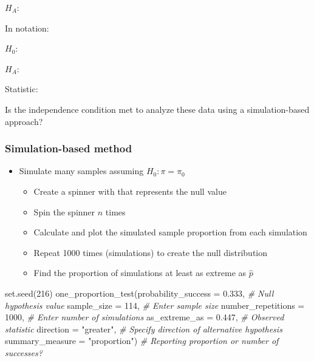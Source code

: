 \documentclass[
]{report}
\newenvironment{Shaded}{\begin{snugshade}}{\end{snugshade}}
\newcommand{\AttributeTok}[1]{\textcolor[rgb]{0.77,0.63,0.00}{#1}}
\newcommand{\CommentTok}[1]{\textcolor[rgb]{0.56,0.35,0.01}{\textit{#1}}}
\newcommand{\DecValTok}[1]{\textcolor[rgb]{0.00,0.00,0.81}{#1}}
\newcommand{\FloatTok}[1]{\textcolor[rgb]{0.00,0.00,0.81}{#1}}
\newcommand{\FunctionTok}[1]{\textcolor[rgb]{0.00,0.00,0.00}{#1}}
\newcommand{\NormalTok}[1]{#1}
\newcommand{\StringTok}[1]{\textcolor[rgb]{0.31,0.60,0.02}{#1}}
\begin{document}
\vspace{0.5in}

\(H_A:\)

\vspace{0.5in}

In notation:

\(H_0:\)

\vspace{0.2in}

\(H_A:\)

\vspace{0.2in}

Statistic:

\vspace{0.2in}

Is the independence condition met to analyze these data using a simulation-based approach?

\vspace{0.3in}

\hypertarget{simulation-based-method-1}{%
\subsubsection*{Simulation-based method}\label{simulation-based-method-1}}

\begin{itemize}
\item
  Simulate many samples assuming \(H_0: \pi = \pi_0\)

  \begin{itemize}
  \item
    Create a spinner with that represents the null value
  \item
    Spin the spinner \(n\) times
  \item
    Calculate and plot the simulated sample proportion from each simulation
  \item
    Repeat 1000 times (simulations) to create the null distribution
  \item
    Find the proportion of simulations at least as extreme as \(\hat{p}\)
  \end{itemize}
\end{itemize}

\begin{Shaded}
\begin{Highlighting}[]
\FunctionTok{set.seed}\NormalTok{(}\DecValTok{216}\NormalTok{)}
\FunctionTok{one\_proportion\_test}\NormalTok{(}\AttributeTok{probability\_success =} \FloatTok{0.333}\NormalTok{, }\CommentTok{\# Null hypothesis value}
          \AttributeTok{sample\_size =} \DecValTok{114}\NormalTok{, }\CommentTok{\# Enter sample size}
          \AttributeTok{number\_repetitions =} \DecValTok{1000}\NormalTok{, }\CommentTok{\# Enter number of simulations}
          \AttributeTok{as\_extreme\_as =} \FloatTok{0.447}\NormalTok{, }\CommentTok{\# Observed statistic}
          \AttributeTok{direction =} \StringTok{"greater"}\NormalTok{, }\CommentTok{\# Specify direction of alternative hypothesis}
          \AttributeTok{summary\_measure =} \StringTok{"proportion"}\NormalTok{) }\CommentTok{\# Reporting proportion or number of successes?}
\end{Highlighting}
\end{Shaded}
\end{document}
